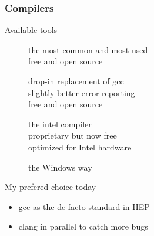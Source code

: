 \begin{frame}[fragile]
  \frametitle{Compilers}
  \begin{block}{Available tools}
    \begin{description}
    \item[\href{http://gcc.gnu.org/}{}]
        the most common and most used\\
        free and open source
    \item[\href{http://clang.llvm.org/}{}]
        drop-in replacement of gcc \\
        slightly better error reporting \\
        free and open source
    \item[\href{http://software.intel.com/en-us/intel-compilers}{}]
        the intel compiler \\
        proprietary but now free \\
        optimized for Intel hardware
    \item[\href{http://www.microsoft.com/}{}]
      the Windows way
    \end{description}
  \end{block}
  \begin{alertblock}{My prefered choice today}
    \begin{itemize}
      \item \alert{gcc} as the de facto standard in HEP
      \item \hspace{0pt}\alert{clang} in parallel to catch more bugs
    \end{itemize}
  \end{alertblock}
\end{frame}

